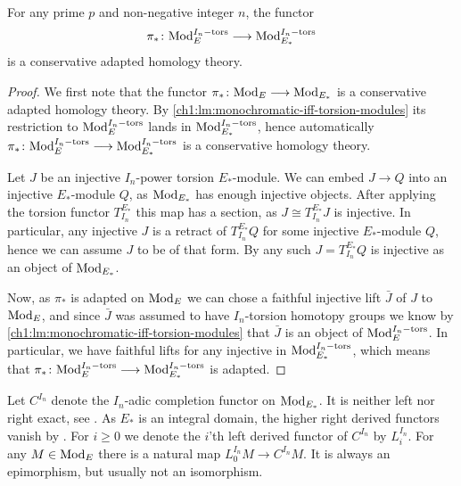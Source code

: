 \begin{lemma}
    \label{ch1:lm:conservative-adapted-torsion-modules}
    For any prime $p$ and non-negative integer $n$, the functor 
    \[\pi_*\colon \mathrm{Mod}_{E}^{I_n-\mathrm{tors}}\longrightarrow \mathrm{Mod}_{E_*}^{I_n-\mathrm{tors}}\]
    is a conservative adapted homology theory. 
\end{lemma}
\begin{proof}
    We first note that the functor $\pi_*\colon \mathrm{Mod}_{E}\longrightarrow \mathrm{Mod}_{E_*}$ is a conservative adapted homology theory. By \cref{ch1:lm:monochromatic-iff-torsion-modules} its restriction to $\mathrm{Mod}_{E}^{I_n-\mathrm{tors}}$ lands in $\mathrm{Mod}_{E_*}^{I_n-\mathrm{tors}}$, hence automatically $\pi_*\colon \mathrm{Mod}_{E}^{I_n-\mathrm{tors}}\longrightarrow \mathrm{Mod}_{E_*}^{I_n-\mathrm{tors}}$ is a conservative homology theory. 
    
    Let $J$ be an injective $I_n$-power torsion $E_*$-module. We can embed $J\longrightarrow Q$ into an injective $E_*$-module $Q$, as $\mathrm{Mod}_{E_*}$ has enough injective objects. After applying the torsion functor $T^{E_*}_{I_n}$ this map has a section, as $J \cong T^{E_*}_{I_n}J$ is injective. In particular, any injective $J$ is a retract of $T^{E_*}_{I_n}Q$ for some injective $E_*$-module $Q$, hence we can assume $J$ to be of that form. By \cite[2.1.4]{brodmann-sharp_1998} any such $J = T^{E_*}_{I_n}Q$ is injective as an object of $\mathrm{Mod}_{E_*}$. 
    
    Now, as $\pi_*$ is adapted on $\mathrm{Mod}_{E}$ we can chose a faithful injective lift $\bar{J}$ of $J$ to $\mathrm{Mod}_{E}$, and since $\bar{J}$ was assumed to have $I_n$-torsion homotopy groups we know by \cref{ch1:lm:monochromatic-iff-torsion-modules} that $\bar{J}$ is an object of $\mathrm{Mod}_{E}^{I_n-\mathrm{tors}}$. In particular, we have faithful lifts for any injective in $\mathrm{Mod}_{E_*}^{I_n-\mathrm{tors}}$, which means that $\pi_*\colon \mathrm{Mod}_{E}^{I_n-\mathrm{tors}}\longrightarrow \mathrm{Mod}_{E_*}^{I_n-\mathrm{tors}}$ is adapted. 
\end{proof}

Let $C^{I_n}$ denote the $I_n$-adic completion functor on $\mathrm{Mod}_{E_*}$. It is neither left nor right exact, see \cite[Appendix A.]{hovey-strickland_99}. As $E_*$ is an integral domain, the higher right derived functors vanish by \cite[5.1]{greenlees-may_92}. For $i\geq 0$ we denote the $i$'th left derived functor of $C^{I_n}$ by $L^{I_n}_i$. For any $M\in \mathrm{Mod}_{E}$ there is a natural map $L^{I_n}_0 M \longrightarrow C^{I_n}M$. It is always an epimorphism, but usually not an isomorphism. 

